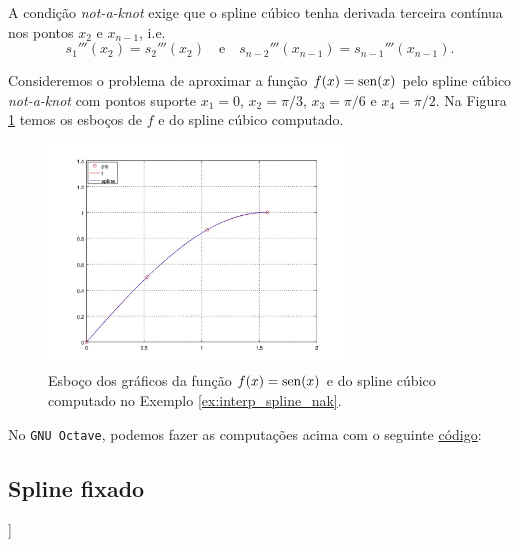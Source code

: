 A condição {\it not-a-knot} exige que o spline cúbico tenha derivada terceira contínua nos pontos $x_2$ e $x_{n-1}$, i.e.
\begin{equation}
  s_1'''(x_2) = s_2'''(x_2)\quad\text{e}\quad s_{n-2}'''(x_{n-1}) = s_{n-1}'''(x_{n-1}).
\end{equation}

\begin{ex}\label{ex:interp_spline_nak}
  Consideremos o problema de aproximar a função $f(x)=\operatorname{sen}(x)$ pelo spline cúbico {\it not-a-knot} com pontos suporte $x_1=0$, $x_2=\pi/3$, $x_3=\pi/6$ e $x_4=\pi/2$. Na Figura \ref{fig:interp_spline_nak} temos os esboços de $f$ e do spline cúbico computado.

  \begin{figure}[h!]
    \centering
    \includegraphics[width=0.7\textwidth]{./cap_interp/dados/ex_interp_spline_nak/fig_interp_spline_nak}
    \caption{Esboço dos gráficos da função $f(x)=\operatorname{sen}(x)$ e do spline cúbico computado no Exemplo \ref{ex:interp_spline_nak}.}
    \label{fig:interp_spline_nak}
  \end{figure}

\ifisoctave
No \verb+GNU Octave+, podemos fazer as computações acima com o seguinte \href{https://github.com/phkonzen/notas/blob/master/src/MatematicaNumerica/cap_interp/dados/ex_interp_spline_nak/ex_interp_spline_nak.m}{código}:

\fi
\end{ex}

\subsection{Spline fixado}

\begin{flushleft}
  [[tag:revisar]]
\end{flushleft}

